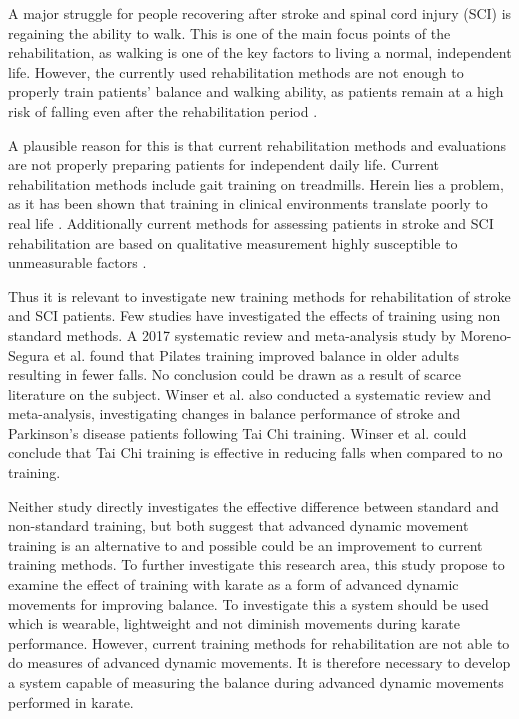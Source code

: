 
A major struggle for people recovering after stroke and spinal cord injury (SCI) is regaining the ability to walk. This is one of the main focus points of the rehabilitation, as walking is one of the key factors to living a normal, independent life. However, the currently used rehabilitation methods are not enough to properly train patients' balance and walking ability, as patients remain at a high risk of falling even after the rehabilitation period \cite{Blennerhassett2012, Hanger2014, Wannapakhe2015, Wong2016, Bhalla2016}.

A plausible reason for this is that current rehabilitation methods and evaluations are not properly preparing patients for independent daily life. Current rehabilitation methods include gait training on treadmills. Herein lies a problem, as it has been shown that training in clinical environments translate poorly to real life \cite{Basteris2014}. Additionally current methods for assessing patients in stroke and SCI rehabilitation are based on qualitative measurement highly susceptible to unmeasurable factors \cite{Wang2010, ANPT_SCI2018, ANPT_Stroke2018}. 

Thus it is relevant to investigate new training methods for rehabilitation of stroke and SCI patients. Few studies have investigated the effects of training using non standard methods. A 2017 systematic review and meta-analysis study by Moreno-Segura et al. \cite{Moreno2017} found that Pilates training improved balance in older adults resulting in fewer falls. No conclusion could be drawn as a result of scarce literature on the subject. Winser et al. \cite{Winser2018} also conducted a systematic review and meta-analysis, investigating changes in balance performance of stroke and Parkinson's disease patients following Tai Chi training. Winser et al. could conclude that Tai Chi training is effective in reducing falls when compared to no training.  

Neither study directly investigates the effective difference between standard and non-standard training, but both suggest that advanced dynamic movement training is an alternative to and possible could be an improvement to current training methods. 
To further investigate this research area, this study propose to examine the effect of training with karate as a form of advanced dynamic movements for improving balance. 
To investigate this a system should be used which is wearable, lightweight and not diminish movements during karate performance. However, current training methods for rehabilitation are not able to do measures of advanced dynamic movements. It is therefore necessary to develop a system capable of measuring the balance during advanced dynamic movements performed in karate. 

